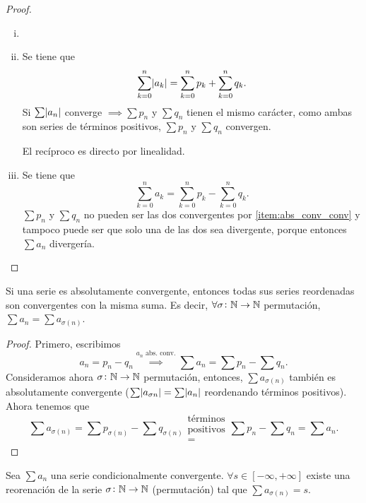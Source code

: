 \begin{proof}
  \begin{enumerate}[i)]
      \item[]
      \item Se tiene que
            \[
                \sum\limits_{k=0}^ n \abs{a_k} = \sum\limits_{k=0}^ n p_k + \sum\limits_{k=0}^n q_k.
        \]
        Si $\sum \abs{a_n}$ converge $\implies \sum p_n$ y $\sum q_n$ tienen el mismo carácter,
            como ambas son series de términos positivos, $\sum p_n$ y $\sum q_n$ convergen.

            El recíproco es directo por linealidad.
        \item Se tiene que
            \[
                \sum_{k=0}^n a_k = \sum_{k=0}^n p_k - \sum_{k=0}^n q_k.
            \]
            $\sum p_n$ y $\sum q_n$ no pueden ser las dos convergentes por \ref{item:abs_conv_conv}
            y tampoco puede ser que solo una de las dos sea divergente, porque entonces
            $\sum a_n$ divergería.
  \end{enumerate}
\end{proof}

\begin{prop}
    Si una serie es absolutamente convergente, entonces todas sus series reordenadas
    son convergentes con la misma suma. Es decir, $\forall \sigma \colon \mathbb{N} \to \mathbb{N}$
    permutación, $\sum a_n = \sum a_{\sigma(n)}$.
\end{prop}

\begin{proof}
    Primero, escribimos
    \[
        a_n = p_n - q_n \stackrel{\text{$a_n$ abs. conv.}}{\implies}
        \sum a_n = \sum p_n - \sum q_n.
    \]
    Consideramos ahora $\sigma \colon \mathbb{N} \to \mathbb{N}$ permutación, entonces, $\sum a_{\sigma(n)}$
    también es absolutamente convergente ($\sum \abs{a_{\sigma{n}}} = \sum \abs{a_n}$
    reordenando términos positivos). Ahora tenemos que
    \[
        \sum a_{\sigma(n)} = \sum p_{\sigma(n)} - \sum q_{\sigma(n)}
        \substack{\text{términos} \\ \text{positivos} \\ =} \sum p_n - \sum q_n = \sum a_n.
    \]
\end{proof}

\begin{teo}
    Sea $\sum a_n$ una serie condicionalmente convergente. $\forall s \in [-\infty,+\infty]$
    existe una reorenación de la serie $\sigma \colon \mathbb{N} \to \mathbb{N}$ (permutación) tal que
    $\sum a_{\sigma(n)} = s$.
\end{teo}

